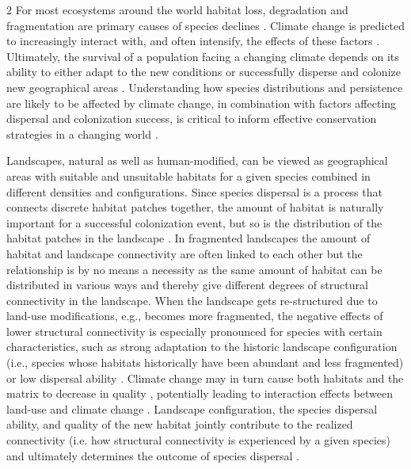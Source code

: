 \documentclass[12pt,pdftex]{article}
\begin{document}
\begin{spacing}{2}
For most ecosystems around the world habitat loss, degradation and fragmentation are primary causes of species declines \citep{Fahrig2003, JoernFischer2006}. Climate change is predicted to increasingly interact with, and often intensify, the effects of these factors \citep{Doerr2011}. Ultimately, the survival of a population facing a changing climate depends on its ability to either adapt to the new conditions \citep{Hoffmann2011,Sentis2015} or successfully disperse and colonize new geographical areas \citep{Travis2013}.  Understanding how species distributions and persistence are likely to be affected by climate change, in combination with factors affecting dispersal and colonization success, is critical to inform effective conservation strategies in a changing world \citep{Gillson2013a}. 

Landscapes, natural as well as human-modified, can be viewed as geographical areas with suitable and unsuitable habitats for a given species combined in different densities and configurations. Since species dispersal is a process that connects discrete habitat patches together, the amount of habitat is naturally important for a successful colonization event, but so is the distribution of the habitat patches in the landscape \citep{Villard1999, Baguette2013}. In fragmented landscapes the amount of habitat and landscape connectivity are often linked to each other \citep{Villard2014} but the relationship is by no means a necessity \citep{Wang2014} as the same amount of habitat can be distributed in various ways and thereby give different degrees of structural connectivity in the landscape. When the landscape gets re-structured due to land-use modifications, e.g., becomes more fragmented, the negative effects of lower structural connectivity is especially pronounced for species with certain characteristics, such as strong adaptation to the historic landscape configuration (i.e., species whose habitats historically have been abundant and less fragmented) or low dispersal ability \citep{Martin2016}. Climate change may in turn cause both habitats and the matrix to decrease in quality \citep{Martin2016}, potentially leading to interaction effects between land-use and climate change \citep{Pielke2005}. Landscape configuration, the species dispersal ability, and quality of the new habitat jointly contribute to the realized connectivity (i.e. how structural connectivity is experienced by a given species) and ultimately determines the outcome of species dispersal \citep{Baguette2013, Borthagaray2014}. 


\end{spacing}
\end{document}
